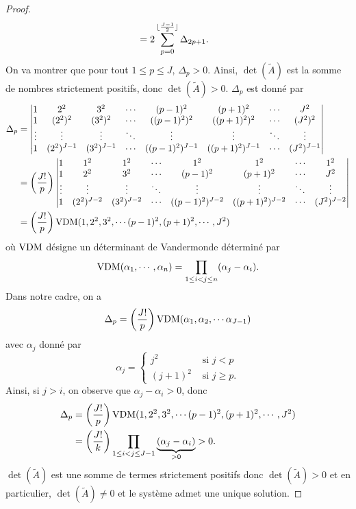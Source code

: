 \begin{proof}
\begin{align*}
& = 2 \displaystyle\sum\limits_{p=0}^{\lfloor \frac{J-1}{2} \rfloor} \Delta_{2p+1}.
\end{align*}
On va montrer que pour tout $1 \leq p \leq J$, $\Delta_p >0$. Ainsi, $\det(\tilde{A})$ est la somme de nombres strictement positifs, donc $\det(\tilde{A})>0$. $\Delta_p$ est donné par
\begin{align*}
\Delta_p & = \begin{vmatrix}
1 & 2^2 & 3^2 & \cdots & (p-1)^2 & (p+1)^2 & \cdots & J^2 \\ 
1 & (2^2)^2 & (3^2)^2 & \cdots & ((p-1)^2)^2 & ((p+1)^2)^{2} & \cdots & (J^2)^2 \\ 
\vdots & \vdots & \vdots & \ddots & \vdots & \vdots & \ddots & \vdots \\ 
1 & (2^2)^{J-1} & (3^2)^{J-1} & \cdots & ((p-1)^2)^{J-1} & ((p+1)^2)^{J-1} & \cdots & (J^2)^{J-1}
\end{vmatrix} \\
& = \left( \dfrac{J!}{p} \right) \begin{vmatrix}
1 & 1^2 & 1^2 & \cdots & 1^2 & 1^2 & \cdots & 1^2 \\ 
1 & 2^2 & 3^2 & \cdots & (p-1)^2 & (p+1)^{2} & \cdots & J^2 \\ 
\vdots & \vdots & \vdots & \ddots & \vdots & \vdots & \ddots & \vdots \\ 
1 & (2^2)^{J-2} & (3^2)^{J-2} & \cdots & ((p-1)^2)^{J-2} & ((p+1)^2)^{J-2} & \cdots & (J^2)^{J-2}
\end{vmatrix} \\
& = \left( \dfrac{J!}{p} \right) \text{VDM}(1, 2^2, 3^2, \cdots (p-1)^2, (p+1)^2, \cdots, J^2)
\end{align*}
où $\text{VDM}$ désigne un déterminant de Vandermonde \cite{Evans1976} déterminé par 
\begin{equation}
\text{VDM}(\alpha_1, \cdots, \alpha_n) = \displaystyle\prod\limits_{1\leq i < j \leq n} (\alpha_j - \alpha_i).
\end{equation}
Dans notre cadre, on a
\begin{equation}
\Delta_p = \left( \dfrac{J!}{p} \right) \text{VDM}(\alpha_1, \alpha_2, \cdots \alpha_{J-1})
\end{equation}
avec $\alpha_j$ donné par
\begin{equation}
\alpha_j = \left\lbrace
\begin{array}{cl}
j^2 & \text{ si } j<p \\
(j+1)^2 & \text{ si } j \geq p.
\end{array}
\right.
\end{equation}
Ainsi, si $j>i$, on observe que $\alpha_j - \alpha_i>0$, donc
\begin{align*}
\Delta_p & = \left( \dfrac{J!}{p} \right) \text{VDM}(1, 2^2, 3^2, \cdots (p-1)^2, (p+1)^2, \cdots, J^2) \\
	& = \left( \dfrac{J!}{k} \right)  \displaystyle\prod\limits_{1\leq i < j \leq J-1} \underbrace{(\alpha_j - \alpha_i)}_{>0} >0.
\end{align*}
$\det(\tilde{A})$ est une somme de termes strictement positifs donc $\det(\tilde{A})>0$ et en particulier, $\det(\tilde{A}) \neq 0$ et le système admet une unique solution.
\end{proof}

